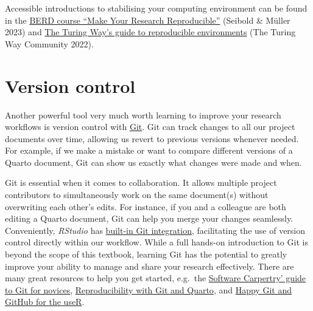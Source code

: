 \documentclass[
  letterpaper,
  DIV=11,
  numbers=noendperiod]{scrreprt}
\begin{document}
\begin{tcolorbox}[enhanced jigsaw, arc=.35mm, bottomrule=.15mm, bottomtitle=1mm, breakable, colback=white, colbacktitle=quarto-callout-note-color!10!white, colframe=quarto-callout-note-color-frame, coltitle=black, left=2mm, leftrule=.75mm, opacityback=0, opacitybacktitle=0.6, rightrule=.15mm, title=\textcolor{quarto-callout-note-color}{\faInfo}\hspace{0.5em}{Going further~\emoji{rocket}}, titlerule=0mm, toprule=.15mm, toptitle=1mm]

Accessible introductions to stabilising your computing environment can
be found in the
\href{https://berd-nfdi.github.io/BERD-reproducible-research-course/3-3-stabilize.html}{BERD
course ``Make Your Research Reproducible''} (Seibold \& Müller 2023) and
\href{https://the-turing-way.netlify.app/reproducible-research/renv.html}{The
Turing Way's guide to reproducible environments} (The Turing Way
Community 2022).

\end{tcolorbox}

\section{Version control}\label{version-control}

Another powerful tool very much worth learning to improve your research
workflows is version control with \href{https://git-scm.com/learn}{Git}.
Git can track changes to all our project documents over time, allowing
us revert to previous versions whenever needed. For example, if we make
a mistake or want to compare different versions of a Quarto document,
Git can show us exactly what changes were made and when.

Git is essential when it comes to collaboration. It allows multiple
project contributors to simultaneously work on the same document(s)
without overwriting each other's edits. For instance, if you and a
colleague are both editing a Quarto document, Git can help you merge
your changes seamlessly. Conveniently, \emph{RStudio} has
\href{https://docs.posit.co/ide/user/ide/guide/tools/version-control.html}{built-in
Git integration}, facilitating the use of version control directly
within our workflow. While a full hands-on introduction to Git is beyond
the scope of this textbook, learning Git has the potential to greatly
improve your ability to manage and share your research effectively.
There are many great resources to help you get started, e.g.~the
\href{https://swcarpentry.github.io/git-novice/}{Software Carpertry'
guide to Git for novices},
\href{https://genomicsaotearoa.github.io/reproducibility_with_git_and_quarto/git_overview.html}{Reproducibility
with Git and Quarto}, and \href{https://happygitwithr.com/}{Happy Git
and GitHub for the useR}.
\end{document}
